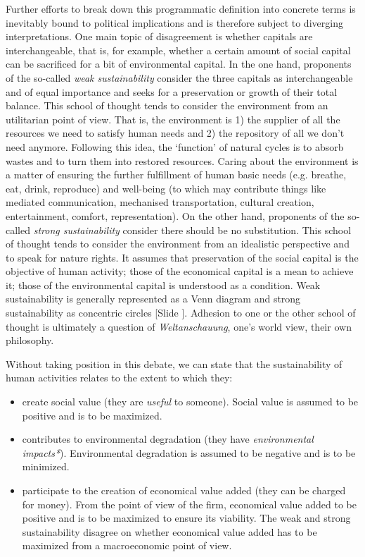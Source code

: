 \documentclass{article}
\newcounter{slide}
\begin{document}
Further efforts to break down this programmatic definition into concrete terms is inevitably bound to political implications and is therefore subject to diverging interpretations. One main topic of disagreement is whether capitals are interchangeable, that is, for example, whether a certain amount of social capital can be sacrificed for a bit of environmental capital. In the one hand, proponents of the so-called \emph{weak sustainability} consider the three capitals as interchangeable and of equal importance and seeks for a preservation or growth of their total balance. This school of thought tends to consider the environment from an utilitarian point of view. That is, the environment is 1) the supplier of all the resources we need to satisfy human needs and 2) the repository of all we don't need anymore. Following this idea, the `function' of natural cycles is to absorb wastes and to turn them into restored resources. Caring about the environment is a matter of ensuring the further fulfillment of human basic needs (e.g. breathe, eat, drink, reproduce) and well-being (to which may contribute things like mediated communication, mechanised transportation, cultural creation, entertainment, comfort, representation). On the other hand, proponents of the so-called \emph{strong sustainability} consider there should be no substitution. This school of thought tends to consider the environment from an idealistic perspective and to speak for nature rights. It assumes that preservation of the social capital is the objective of human activity; those of the economical capital is a mean to achieve it; those of the environmental capital is understood as a condition. Weak sustainability is generally represented as a Venn diagram and strong sustainability as concentric circles {\color{blue}[Slide ]}. Adhesion to one or the other school of thought is ultimately a question of \emph{Weltanschauung}, one's world view, their own philosophy.

Without taking position in this debate, we can state that the sustainability of human activities relates to the extent to which they:
\begin{itemize}
	\item create social value (they are \emph{useful} to someone). Social value is assumed to be positive and is to be maximized. 
	\item contributes to environmental degradation (they have \emph{environmental impacts*}). Environmental degradation is assumed to be negative and is to be minimized.
	\item participate to the creation of economical value added (they can be charged for money). From the point of view of the firm, economical value added to be positive and is to be maximized to ensure its viability. The weak and strong sustainability disagree on whether economical value added has to be maximized from a macroeconomic point of view.
\end{itemize}
\end{document}
